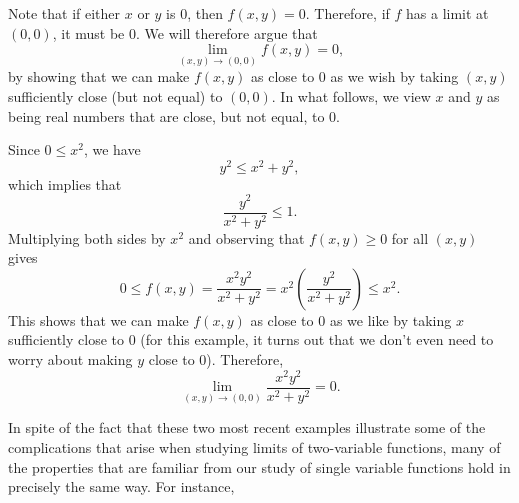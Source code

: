 Note that if either $x$ or $y$ is 0, then $f(x,y) = 0$. Therefore, if
$f$ has a limit at $(0,0)$, it must be 0.  We will therefore argue
that
$$
\lim_{(x,y)\to(0,0)}f(x,y) = 0,
$$
by showing that we can make $f(x,y)$ as close to $0$ as we wish by taking $(x,y)$ sufficiently close (but not equal) to $(0,0)$.  In what follows, we view $x$ and $y$ as being real numbers that are close, but not equal, to 0.

Since $0 \leq x^2$, we have 
$$
y^2 \leq x^2+y^2,
$$
which implies that
$$\frac{y^2}{x^2+y^2} \leq 1.$$
Multiplying both sides by $x^2$ and observing that $f(x,y) \ge 0$ for all $(x,y)$ gives
$$
0\leq f(x,y) = \frac{x^2y^2}{x^2+y^2} =
x^2\left(\frac{y^2}{x^2+y^2}\right) \leq x^2.
$$
This shows that we can make $f(x,y)$ as close to $0$ as we like
by taking $x$ sufficiently close to $0$ (for this example, it turns out that we don't even need to worry about making $y$ close to 0).  Therefore,
$$
\lim_{(x,y) \to (0,0)} \frac{x^2y^2}{x^2+y^2} = 0.
$$

In spite of the fact that these two most recent examples 
illustrate some of the complications that arise when studying limits
of two-variable functions, many of the properties that are familiar
from our study of single variable functions hold in precisely the same
way.  For instance, 

\vspace*{5pt}
\nin {}
\vspace*{5pt}

